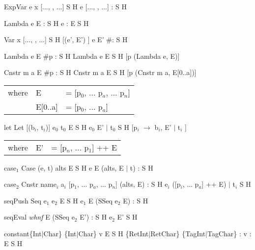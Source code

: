 \documentclass{llncs}
\begin{document}
	{ExpVar e x}	{[..., \px, ...]}	{S}		{H}
	{e}		{[..., \px, ...]}	{\px : S}	{H}
\medskip


	{Lambda e}	{E}			{\px : S}	{H}
	{e}		{\px : E}		{S}		{H}
\medskip


	{Var x}		{[..., \px, ...]}	{S}		{H [\px \bind (e', E') ]}
	{e}		{E'}			{\#{}\px : S}	{H}
\medskip	


	{Lambda e}	{E}			{\#{}p : S}	{H}	
	{Lambda e}	{E}			{S}		{H [p \bind (Lambda e, E)]}
\medskip


	{Cnstr m a}	{E}			{\#p : S}	{H}
	{Cnstr m a}	{E}			{S}		{H [p \bind (Cnstr m a, E[0..a])]}
\smallskip

\begin{tabular}{p{10mm}ll}
	where	& E		& = [p$_0$, ... p$_a$, ... p$_n$] \\
	 	& E[0..a]	& = [p$_0$, ... p$_a$]
\end{tabular}
\medskip


\rruleCfSE 
	{let}
	{Let [(b$_i$, t$_i$)] e$_0$ t$_0$}
	{E} 
	{S}
	{H}
	{e$_0$}	
	{E' $|$ t$_0$}
	{S}
	{H [p$_i$ $\rightarrow$ b$_i$, E' $|$ t$_i$ ]}	
\smallskip

\begin{tabular}{p{10mm}ll}
	where	& E'	& = [p$_n$, ... p$_1$] ++ E
\end{tabular}
\medskip


\rruleCESfH	
	{case$_1$}
	{Case (e, t) alts}	{E}		{S}			{H}
	{e}			{E}		{(alts, E $|$ t) : S}	{H}
\medskip


\rruleCESfH	
	{case$_2$}
	{Cnstr name$_i$ a$_i$}	{[p$_1$, ... p$_a$, ... p$_n$]}		{(alts, E) : S}	{H}
	{e$_i$}			{([p$_i$, ... p$_a$] ++ E) $|$ t$_i$}	{S}		{H}
\medskip


\rruleCESfH
	{seqPush}
	{Seq e$_1$ e$_2$}	{E}		{S}			{H}
	{e$_1$}			{E}		{(SSeq e$_2$ E) : S}	{H}
\medskip


\rruleCESfH
	{seqEval}
	{\emph{whnf}}		{E}		{(SSeq e$_2$ E') : S}	{H}
	{e$_2$}			{E'}		{S}			{H}
\medskip


\rruleCEfHS
	{constant\{Int$|$Char\}}
	{\{Int$|$Char\} v}	{E}				{S}	{H}
	{\{RetInt$|$RetChar\}}	{\{TagInt$|$TagChar\} : v : E}	{S}	{H}
\medskip
\end{document}
